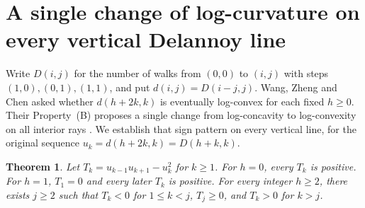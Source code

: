 \documentclass[11pt,a4paper]{article}
\newtheorem{theorem}{Theorem}[section]
\begin{document}
\section{A single change of log-curvature on every vertical Delannoy line}\label{sec:vertical}

Write $D(i,j)$ for the number of walks from $(0,0)$ to $(i,j)$ with steps
$(1,0),(0,1),(1,1)$, and put $d(i,j)=D(i-j,j)$. Wang, Zheng and Chen
asked whether $d(h+2k,k)$ is eventually log-convex for each fixed $h\ge0$.
Their Property~(B) proposes a single change from log-concavity to log-convexity
on all interior rays \cite[Sec.~4]{wzc}. We establish that sign pattern on
every vertical line, for the original sequence $u_k=d(h+2k,k)=D(h+k,k)$.

\begin{theorem}\label{thm:vertical}
Let $T_k=u_{k-1}u_{k+1}-u_k^2$ for $k\ge1$. For $h=0$, every $T_k$ is
positive. For $h=1$, $T_1=0$ and every later $T_k$ is positive. For every
integer $h\ge2$, there exists $j\ge2$ such that $T_k<0$ for $1\le k<j$,
$T_j\ge0$, and $T_k>0$ for $k>j$.
\end{theorem}
\end{document}
